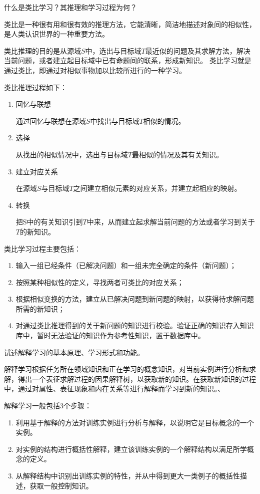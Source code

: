 \begin{question}
什么是类比学习？其推理和学习过程为何？
\end{question}
\begin{solution}
类比是一种很有用和很有效的推理方法，它能清晰，简洁地描述对象间的相似性，是人类认识世界的一种重要方法。\par
类比推理的目的是从源域$S$中，选出与目标域$T$最近似的问题及其求解方法，解决当前问题，或者建立起目标域中已有命题间的联系，形成新知识。 
类比学习就是通过类比，即通过对相似事物加以比较所进行的一种学习。\par
类比推理过程如下：
	\begin{enumerate}
		\item 回忆与联想 \par
		通过回忆与联想在源域$S$中找出与目标域$T$相似的情况。 
		\item 选择 \par
		从找出的相似情况中，选出与目标域$T$最相似的情况及其有关知识。 
		\item 建立对应关系 \par
		在源域$S$与目标域$T$之间建立相似元素的对应关系，并建立起相应的映射。 
		\item 转换 \par
		把S中的有关知识引到$T$中来，从而建立起求解当前问题的方法或者学习到关于$T$的新知识。 
	\end{enumerate} \par
类比学习过程主要包括： 
	\begin{enumerate}
		\item 输入一组已经条件（已解决问题）和一组未完全确定的条件（新问题）；
		\item 按照某种相似性的定义，寻找两者可类比的对应关系；
		\item 根据相似变换的方法，建立从已解决问题到新问题的映射，以获得待求解问题所需的新知识；
		\item 对通过类比推理得到的关于新问题的知识进行校验。验证正确的知识存入知识库中，暂时无法验证的知识作为参考性知识，置于数据库中。
	\end{enumerate}
\end{solution}

\begin{question}
试述解释学习的基本原理、学习形式和功能。
\end{question}
\begin{solution}
解释学习根据任务所在领域知识和正在学习的概念知识，对当前实例进行分析和求解，得出一个表征求解过程的因果解释树，以获取新的知识。在获取新知识的过程中，通过对属性、表征现象和内在关系等进行解释而学习到新的知识。、\par
解释学习一般包括3个步骤：
	\begin{enumerate}
		\item 利用基于解释的方法对训练实例进行分析与解释，以说明它是目标概念的一个实例。
		\item 对实例的结构进行概括性解释，建立该训练实例的一个解释结构以满足所学概念的定义。
		\item 从解释结构中识别出训练实例的特性，并从中得到更大一类例子的概括性描述，获取一般控制知识。
	\end{enumerate}
\end{solution}

